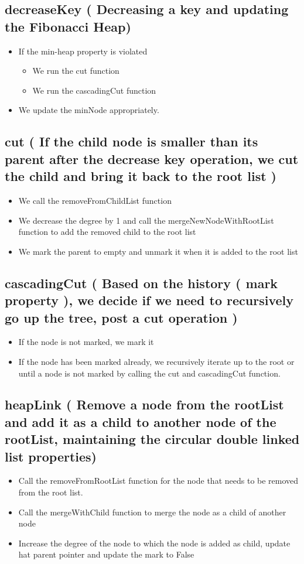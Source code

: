 \subsection{decreaseKey ( Decreasing a key and updating the Fibonacci Heap)}
		\begin{itemize}
			\item If the min-heap property is violated
			\begin{itemize}
				\item We run the cut function
				\item We run the cascadingCut function
			\end{itemize}
			\item We update the minNode appropriately.
		\end{itemize}
\subsection{ cut ( If the child node is smaller than its parent after the decrease key operation, we cut the child and bring it back to the root list )}
		\begin{itemize}
			\item We call the removeFromChildList function
			\item We decrease the degree by 1 and call the mergeNewNodeWithRootList function to add the removed child to the root list
			\item We mark the parent to empty and unmark it when it is added to the root list
		\end{itemize}
\subsection{ cascadingCut ( Based on the history ( mark property ), we decide if we need to recursively go up the tree, post a cut operation )}
		\begin{itemize}
			\item If the node is not marked, we mark it
			\item If the node has been marked already, we recursively iterate up to the root or until a node is not marked by calling the cut and cascadingCut function.	
		\end{itemize}
\subsection{heapLink ( Remove a node from the rootList and add it as a child to another node of the rootList, maintaining the circular double linked list properties)}
		\begin{itemize}
			\item Call the removeFromRootList function for the node that needs to be removed from the root list.
			\item Call the mergeWithChild function to merge the node as a child of another node
			\item Increase the degree of the node to which the node is added as child, update hat parent pointer and update the mark to False
		\end{itemize}
